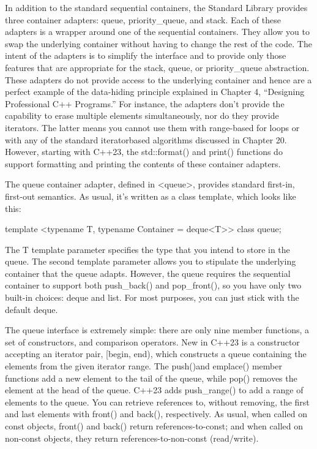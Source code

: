 
In addition to the standard sequential containers, the Standard Library provides three container adapters: queue, priority\_queue, and stack. Each of these adapters is a wrapper around one of the sequential containers. They allow you to swap the underlying container without having to change the rest of the code. The intent of the adapters is to simplify the interface and to provide only those features that are appropriate for the stack, queue, or priority\_queue abstraction. These adapters do not provide access to the underlying container and hence are a perfect example of the data-hiding principle explained in Chapter 4, “Designing Professional C++ Programs.” For instance, the adapters don’t provide the capability to erase multiple elements simultaneously, nor do they provide iterators. The latter means you cannot use them with range-based for loops or with any of the standard iteratorbased algorithms discussed in Chapter 20. However, starting with C++23, the std::format() and print() functions do support formatting and printing the contents of these container adapters.


The queue container adapter, defined in <queue>, provides standard first-in, first-out semantics. As usual, it’s written as a class template, which looks like this:

\begin{cpp}
template <typename T, typename Container = deque<T>> class queue;
\end{cpp}

The T template parameter specifies the type that you intend to store in the queue. The second template parameter allows you to stipulate the underlying container that the queue adapts. However, the queue requires the sequential container to support both push\_back() and pop\_front(), so you have only two built-in choices: deque and list. For most purposes, you can just stick with the default deque.


The queue interface is extremely simple: there are only nine member functions, a set of constructors, and comparison operators. New in C++23 is a constructor accepting an iterator pair, [begin, end), which constructs a queue containing the elements from the given iterator range. The push()and emplace() member functions add a new element to the tail of the queue, while pop() removes the element at the head of the queue. C++23 adds push\_range() to add a range of elements to the queue. You can retrieve references to, without removing, the first and last elements with front() and back(), respectively. As usual, when called on const objects, front() and back() return references-to-const; and when called on non-const objects, they return references-to-non-const (read/write).

